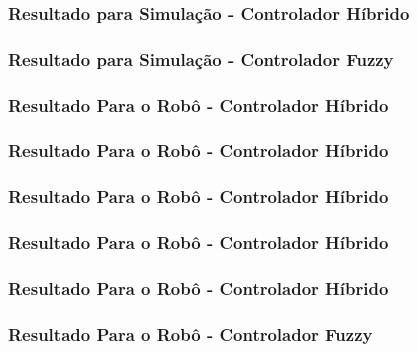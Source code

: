 \begin{frame}
	\frametitle{Resultado para Simulação - Controlador Híbrido}
	
\end{frame}

\begin{frame}
	\frametitle{Resultado para Simulação - Controlador Fuzzy}
	
\end{frame}

\begin{frame}
	\frametitle{Resultado Para o Robô - Controlador Híbrido}
	
\end{frame}

\begin{frame}
	\frametitle{Resultado Para o Robô - Controlador Híbrido}
	
\end{frame}

\begin{frame}
	\frametitle{Resultado Para o Robô - Controlador Híbrido}
	
\end{frame}

\begin{frame}
	\frametitle{Resultado Para o Robô - Controlador Híbrido}
	
\end{frame}

\begin{frame}
	\frametitle{Resultado Para o Robô - Controlador Híbrido}
	
\end{frame}

\begin{frame}
	\frametitle{Resultado Para o Robô - Controlador Fuzzy}
	
\end{frame}
